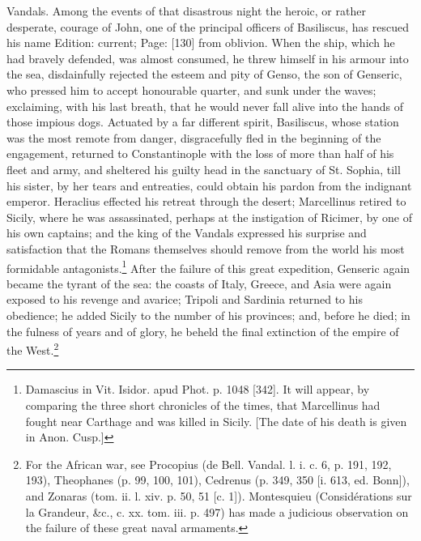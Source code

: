 Vandals. Among the events of that disastrous night the heroic, or rather desperate, courage of John, one of the principal officers of Basiliscus, has rescued his name Edition: current; Page: [130] from oblivion. When the ship, which he had bravely defended, was almost consumed, he threw himself in his armour into the sea, disdainfully rejected the esteem and pity of Genso, the son of Genseric, who pressed him to accept honourable quarter, and sunk under the waves; exclaiming, with his last breath, that he would never fall alive into the hands of those impious dogs. Actuated by a far different spirit, Basiliscus, whose station was the most remote from danger, disgracefully fled in the beginning of the engagement, returned to Constantinople with the loss of more than half of his fleet and army, and sheltered his guilty head in the sanctuary of St. Sophia, till his sister, by her tears and entreaties, could obtain his pardon from the indignant emperor. Heraclius effected his retreat through the desert; Marcellinus retired to Sicily, where he was assassinated, perhaps at the instigation of Ricimer, by one of his own captains; and the king of the Vandals expressed his surprise and satisfaction that the Romans themselves should remove from the world his most formidable antagonists.\footnote{Damascius in Vit. Isidor. apud Phot. p. 1048 [342]. It will appear, by comparing the three short chronicles of the times, that Marcellinus had fought near Carthage and was killed in Sicily. [The date of his death is given in Anon. Cusp.]} After the failure of this great expedition, Genseric again became the tyrant of the sea: the coasts of Italy, Greece, and Asia were again exposed to his revenge and avarice; Tripoli and Sardinia returned to his obedience; he added Sicily to the number of his provinces; and, before he died; in the fulness of years and of glory, he beheld the final extinction of the empire of the West.\footnote{For the African war, see Procopius (de Bell. Vandal. l. i. c. 6, p. 191, 192, 193), Theophanes (p. 99, 100, 101), Cedrenus (p. 349, 350 [i. 613, ed. Bonn]), and Zonaras (tom. ii. l. xiv. p. 50, 51 [c. 1]). Montesquieu (Considérations sur la Grandeur, \&c., c. xx. tom. iii. p. 497) has made a judicious observation on the failure of these great naval armaments.}

